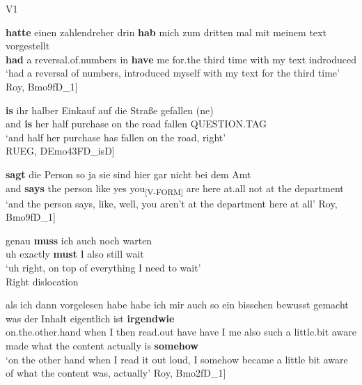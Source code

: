 \documentclass[output=paper,colorlinks,citecolor=brown]{langscibook}
\begin{document}
\ea V1\label{ex:ch1:v1}

\ea\label{ex:ch1:ex17}

\gll \textbf{{hatte}} {einen} {zahlendreher} {drin} \textbf{{hab}} {mich} {zum} {dritten} {mal} {mit} {meinem} {text} {vorgestellt} \\
\textbf{had} a reversal.of.numbers in \textbf{have} me for.the third time with my text indroduced \\
\trans ‘had a reversal of numbers, introduced myself with my text for the third time’ \hspace{\fill}{[}Roy, Bmo9fD\_1{]}

\ex\label{ex:ch1:ex18}

 \textbf{{is}} {ihr} {halber} {Einkauf} {auf} {die} {Straße} {gefallen} ({ne}) \\
and \textbf{is} her half purchase on the road fallen \textsc{QUESTION.TAG} \\
\trans ‘and half her purchase has fallen on the road, right’ \\ \hspace{\fill}{[}RUEG, DEmo43FD\_isD{]}

\ex\label{ex:ch1:ex19}

 \textbf{{sagt}} {die} {Person} {so} {ja} {sie} {sind} {hier} {gar} {nicht} {bei} {dem} {Amt} \\
and \textbf{says} the person like yes you\textsubscript{\textsc{[V-FORM]}} are here at.all not at the department \\
\trans ‘and the person says, like, well, you aren’t at the department here at all’ \hspace{\fill}{[}Roy, Bmo9fD\_1{]}

\ex\label{ex:ch1:ex20}

 {genau} \textbf{{muss}} {ich} {auch} {noch} {warten} \\
uh exactly \textbf{must} I also still wait \\
\trans ‘uh right, on top of everything I need to wait’\\\hspace{\fill}{[RUEG, DEmo39FD\_isD]}
\z
\largerpage
\ex Right dislocation

\ea\label{ex:ch1:ex21}

 {als} {ich} {dann} {vorgelesen} {habe} {habe} {ich} {mir} {auch} {so}  {ein} {bisschen} {bewusst} {gemacht} {was} {der} {Inhalt} {eigentlich} {ist} \textbf{{irgendwie}}\\
on.the.other.hand when I then read.out have have I me also such a little.bit aware made what the content actually is \textbf{somehow} \\
\trans ‘on the other hand when I read it out loud, I somehow became a little bit aware of what the content was, actually’ \hspace{\fill}{[}Roy, Bmo2fD\_1{]}
\end{document}
